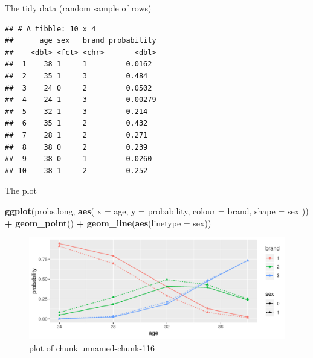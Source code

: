 \documentclass[ignorenonframetext,]{beamer}
\newenvironment{Shaded}{\begin{snugshade}}{\end{snugshade}}
\newcommand{\DataTypeTok}[1]{\textcolor[rgb]{0.13,0.29,0.53}{#1}}
\newcommand{\DecValTok}[1]{\textcolor[rgb]{0.00,0.00,0.81}{#1}}
\newcommand{\KeywordTok}[1]{\textcolor[rgb]{0.13,0.29,0.53}{\textbf{#1}}}
\newcommand{\NormalTok}[1]{#1}
\newcommand{\OperatorTok}[1]{\textcolor[rgb]{0.81,0.36,0.00}{\textbf{#1}}}
\newcommand{\StringTok}[1]{\textcolor[rgb]{0.31,0.60,0.02}{#1}}
\begin{document}
\begin{frame}[fragile]{The tidy data (random sample of rows)}
\protect\hypertarget{the-tidy-data-random-sample-of-rows}{}

\small

\begin{Shaded}
\end{Shaded}

\begin{verbatim}
## # A tibble: 10 x 4
##      age sex   brand probability
##    <dbl> <fct> <chr>       <dbl>
##  1    38 1     1         0.0162 
##  2    35 1     3         0.484  
##  3    24 0     2         0.0502 
##  4    24 1     3         0.00279
##  5    32 1     3         0.214  
##  6    35 1     2         0.432  
##  7    28 1     2         0.271  
##  8    38 0     2         0.239  
##  9    38 0     1         0.0260 
## 10    38 1     2         0.252
\end{verbatim}

\normalsize

\end{frame}

\begin{frame}[fragile]{The plot}
\protect\hypertarget{the-plot-1}{}

\begin{Shaded}
\begin{Highlighting}[]
\KeywordTok{ggplot}\NormalTok{(probs.long, }\KeywordTok{aes}\NormalTok{(}
  \DataTypeTok{x =}\NormalTok{ age, }\DataTypeTok{y =}\NormalTok{ probability,}
  \DataTypeTok{colour =}\NormalTok{ brand, }\DataTypeTok{shape =}\NormalTok{ sex}
\NormalTok{)) }\OperatorTok{+}
\StringTok{  }\KeywordTok{geom_point}\NormalTok{() }\OperatorTok{+}\StringTok{ }\KeywordTok{geom_line}\NormalTok{(}\KeywordTok{aes}\NormalTok{(}\DataTypeTok{linetype =}\NormalTok{ sex))}
\end{Highlighting}
\end{Shaded}

\begin{figure}
\centering
\includegraphics{figure/unnamed-chunk-116-1.pdf}
\caption{plot of chunk unnamed-chunk-116}
\end{figure}

\end{frame}
\end{document}
